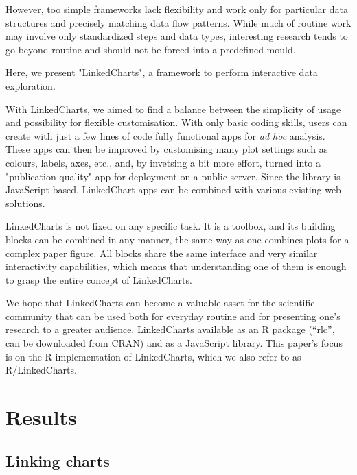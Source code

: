 \documentclass[twocolumn,10pt]{article}
\begin{document}
However, too simple frameworks lack flexibility and work only for particular data structures and precisely matching data flow patterns. While much of routine work may involve only standardized steps and data types, interesting research tends to go beyond routine and should not be forced into a predefined mould.

Here, we present "LinkedCharts", a framework to perform interactive data exploration. 

With LinkedCharts, we aimed to find a balance between the simplicity of usage and possibility for flexible customisation. With only basic coding skills, users can create with just a few lines of code fully functional apps for \emph{ad hoc} analysis. These apps can then be improved by customising many plot settings such as colours, labels, axes, etc., and, by invetsing a bit more effort, turned into a "publication quality" app for deployment on a public server. Since the library is JavaScript-based, LinkedChart apps can be combined with various existing web solutions.

LinkedCharts is not fixed on any specific task. It is a toolbox, and its building blocks can be combined in any manner, the same way as one combines plots for a complex paper figure. All blocks share the same interface and very similar interactivity capabilities, which means that understanding one of them is enough to grasp the entire concept of LinkedCharts.

We hope that LinkedCharts can become a valuable asset for the scientific community that can be used both for everyday routine and for presenting one's research to a greater audience. LinkedCharts available as an R package (``rlc'', can be downloaded from CRAN) and as a JavaScript library. This paper's focus is on the R implementation of LinkedCharts, which we also refer to as R/LinkedCharts. 

\section{Results}

\subsection{Linking charts}
\end{document}
